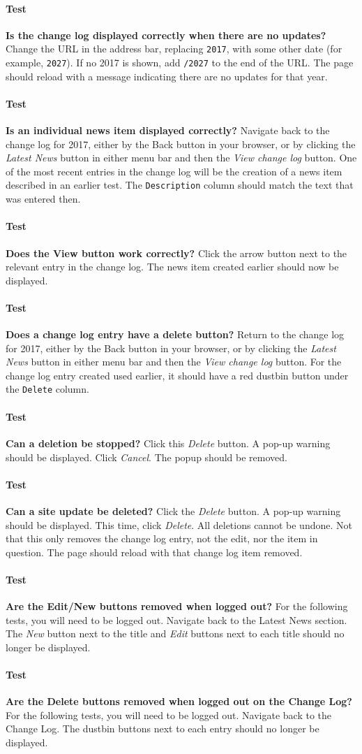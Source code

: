 \documentclass[12pt]{article}
\newcounter{Test}
\newcommand{\test}[1]{%
\stepcounter{Test}%
\paragraph{Test \theTest} \textbf{#1} }
\begin{document}
\test{Is the change log displayed correctly when there are no updates?}
Change the URL in the address bar, replacing \texttt{2017}, with some other date (for example, \texttt{2027}). If no 2017 is shown, add \texttt{/2027} to the end of the URL. The page should reload with a message indicating there are no updates for that year.

\test{Is an individual news item displayed correctly?}
Navigate back to the change log for 2017, either by the Back button in your browser, or by clicking the \textit{Latest News} button in either menu bar and then the \textit{View change log} button. One of the most recent entries in the change log will be the creation of a news item described in an earlier test. The \texttt{Description} column should match the text that was entered then.

\test{Does the View button work correctly?}
Click the arrow button next to the relevant entry in the change log. The news item created earlier should now be displayed.

\test{Does a change log entry have a delete button?}
Return to the change log for 2017, either by the Back button in your browser, or by clicking the \textit{Latest News} button in either menu bar and then the \textit{View change log} button. For the change log entry created used earlier, it should have a red dustbin button under the \texttt{Delete} column.

\test{Can a deletion be stopped?}
Click this \textit{Delete} button. A pop-up warning should be displayed. Click \textit{Cancel}. The popup should be removed.

\test{Can a site update be deleted?}
Click the \textit{Delete} button. A pop-up warning should be displayed. This time, click \textit{Delete}. All deletions cannot be undone. Not that this only removes the change log entry, not the edit, nor the item in question. The page should reload with that change log item removed.

\test{Are the Edit/New buttons removed when logged out?}
For the following tests, you will need to be logged out. Navigate back to the Latest News section. The \textit{New} button next to the title and \textit{Edit} buttons next to each title should no longer be displayed.

\test{Are the Delete buttons removed when logged out on the Change Log?}
For the following tests, you will need to be logged out. Navigate back to the Change Log. The dustbin buttons next to each entry should no longer be displayed.
\end{document}
